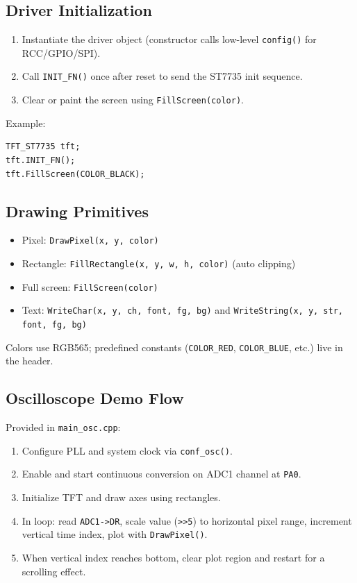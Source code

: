 \documentclass[pdflatex,sn-mathphys-num]{sn-jnl}%
\begin{document}
\subsection{Driver Initialization}
\begin{enumerate}
    \item Instantiate the driver object (constructor calls low-level \texttt{config()} for RCC/GPIO/SPI).
    \item Call \texttt{INIT\_FN()} once after reset to send the ST7735 init sequence.
    \item Clear or paint the screen using \texttt{FillScreen(color)}.
\end{enumerate}
Example:
\begin{verbatim}
TFT_ST7735 tft;
tft.INIT_FN();
tft.FillScreen(COLOR_BLACK);
\end{verbatim}

\subsection{Drawing Primitives}
\begin{itemize}
    \item Pixel: \verb|DrawPixel(x, y, color)|
    \item Rectangle: \verb|FillRectangle(x, y, w, h, color)| (auto clipping)
    \item Full screen: \verb|FillScreen(color)|
    \item Text: \verb|WriteChar(x, y, ch, font, fg, bg)| and \verb|WriteString(x, y, str, font, fg, bg)|
\end{itemize}
Colors use RGB565; predefined constants (\verb|COLOR_RED|, \verb|COLOR_BLUE|, etc.) live in the header.

\subsection{Oscilloscope Demo Flow}
Provided in \texttt{main\_osc.cpp}:
\begin{enumerate}
    \item Configure PLL and system clock via \texttt{conf\_osc()}.
    \item Enable and start continuous conversion on ADC1 channel at \texttt{PA0}.
    \item Initialize TFT and draw axes using rectangles.
    \item In loop: read \verb|ADC1->DR|, scale value (\verb|>>5|) to horizontal pixel range, increment vertical time index, plot with \verb|DrawPixel()|.
    \item When vertical index reaches bottom, clear plot region and restart for a scrolling effect.
\end{enumerate}
\end{document}
